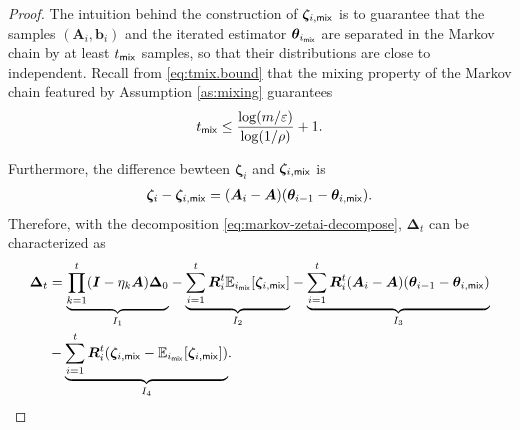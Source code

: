 \begin{proof}
The intuition behind the construction of $\bm{\zeta}_{i,\mathsf{mix}}$ is to guarantee that the samples $(\bm{A}_i,\bm{b}_i)$ and the iterated estimator $\bm{\theta}_{i_{\mathsf{mix}}}$ are separated in the Markov chain by at least $t_{\mathsf{mix}}$ samples, so that their distributions are close to independent. Recall from \eqref{eq:tmix.bound} that the mixing property of the Markov chain featured by Assumption \ref{as:mixing} guarantees
\begin{align}
t_{\mathsf{mix}} \leq \frac{ \log (m/\varepsilon)}{\log (1/\rho)} + 1.
\end{align}

Furthermore, the difference bewteen $\bm{\zeta}_i $ and $\bm{\zeta}_{i,\mathsf{mix}}$ is 
\begin{align}
\bm{\zeta}_i - \bm{\zeta}_{i,\mathsf{mix}} = (\bm{A}_i - \bm{A}) (\bm{\theta}_{i-1} - \bm{\theta}_{i,\mathsf{mix}}).
\end{align}
Therefore, with the decomposition \eqref{eq:markov-zetai-decompose}, $\bm{\Delta}_t$ can be characterized as
\begin{align}\label{eq:markov-deltat-decompose}
\bm{\Delta}_t &= \underset{I_1}{\underbrace{\prod_{k=1}^t (\bm{I}-\eta_k \bm{A}) \bm{\Delta}_0}} - \underset{I_2}{\underbrace{\sum_{i=1}^t \bm{R}_i^t \mathbb{E}_{i_{\mathsf{mix}}}[\bm{\zeta}_{i,\mathsf{mix}}]}} - \underset{I_3}{\underbrace{\sum_{i=1}^t \bm{R}_i^t (\bm{A}_i - \bm{A}) (\bm{\theta}_{i-1} - \bm{\theta}_{i,\mathsf{mix}})}} \nonumber \\ 
&- \underset{I_4}{\underbrace{\sum_{i=1}^t \bm{R}_i^t (\bm{\zeta}_{i,\mathsf{mix}} - \mathbb{E}_{i_{\mathsf{mix}}}[\bm{\zeta}_{i,\mathsf{mix}}])}}.
\end{align}


\end{proof}
